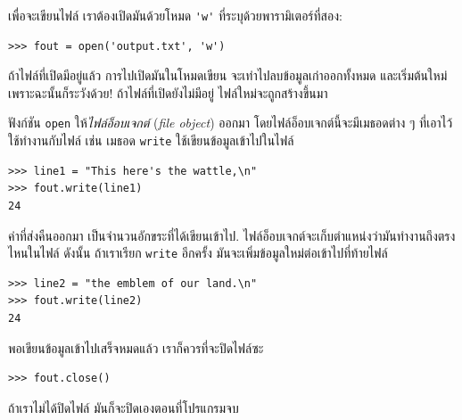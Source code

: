 
เพื่อจะเขียนไฟล์ เราต้องเปิดมันด้วยโหมด \verb|'w'| ที่ระบุด้วยพารามิเตอร์ที่สอง:

\begin{verbatim}
>>> fout = open('output.txt', 'w')
\end{verbatim}
%
%
ถ้าไฟล์ที่เปิดมีอยู่แล้ว การไปเปิดมันในโหมดเขียน จะเท่าไปลบข้อมูลเก่าออกทั้งหมด
และเริ่มต้นใหม่ เพราะฉะนั้นก็ระวังด้วย!
ถ้าไฟล์ที่เปิดยังไม่มีอยู่ ไฟล์ใหม่จะถูกสร้างขึ้นมา



ฟังก์ชัน \texttt{open} ให้\textit{ไฟล์อ็อบเจกต์} (\textit{file object}) ออกมา
โดยไฟล์อ็อบเจกต์นี้จะมีเมธอดต่าง ๆ ที่เอาไว้ใช้ทำงานกับไฟล์
เช่น
เมธอด \texttt{write} ใช้เขียนข้อมูลเข้าไปในไฟล์

\begin{verbatim}
>>> line1 = "This here's the wattle,\n"
>>> fout.write(line1)
24
\end{verbatim}
%
%
ค่าที่ส่งคืนออกมา เป็นจำนวนอักขระที่ได้เขียนเข้าไป.
ไฟล์อ็อบเจกต์จะเก็บตำแหน่งว่ามันทำงานถึงตรงไหนในไฟล์
ดังนั้น ถ้าเราเรียก \texttt{write} อีกครั้ง
มันจะเพิ่มข้อมูลใหม่ต่อเข้าไปที่ท้ายไฟล์

\begin{verbatim}
>>> line2 = "the emblem of our land.\n"
>>> fout.write(line2)
24
\end{verbatim}
%
%
พอเขียนข้อมูลเข้าไปเสร็จหมดแล้ว เราก็ควรที่จะปิดไฟล์ซะ

\begin{verbatim}
>>> fout.close()
\end{verbatim}
%
%
%
ถ้าเราไม่ได้ปิดไฟล์ มันก็จะปิดเองตอนที่โปรแกรมจบ


